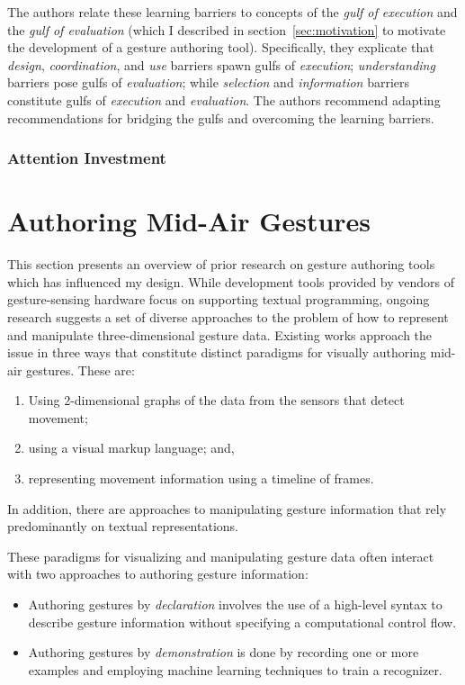 The authors relate these learning barriers to  concepts of the \emph{gulf of execution} and the \emph{gulf of evaluation} (which I described in section~\ref{sec:motivation} to motivate the development of a gesture authoring tool). Specifically, they explicate that \emph{design}, \emph{coordination}, and \emph{use} barriers spawn gulfs of \emph{execution}; \emph{understanding} barriers pose gulfs of \emph{evaluation}; while \emph{selection} and \emph{information} barriers constitute gulfs of \emph{execution} and \emph{evaluation}. The authors recommend adapting  recommendations for bridging the gulfs and overcoming the learning barriers.

\subsubsection{Attention Investment}

\section{Authoring Mid-Air Gestures}

This section presents an overview of prior research on gesture authoring tools which has influenced my design. While development tools provided by vendors of gesture-sensing hardware focus on supporting textual programming, ongoing research suggests a set of diverse approaches to the problem of how to represent and manipulate three-dimensional gesture data. Existing works approach the issue in three ways that constitute distinct paradigms for visually authoring mid-air gestures. These are:

\begin{enumerate}
\item Using 2-dimensional graphs of the data from the sensors that detect movement;
\item using a visual markup language; and,
\item representing movement information using a timeline of
frames.
\end{enumerate}

In addition, there are approaches to manipulating gesture information that rely predominantly on textual representations.

These paradigms for visualizing and manipulating gesture data often interact with two approaches to authoring gesture information:

\begin{itemize}
\item Authoring gestures by \emph{declaration} involves the use of a high-level syntax to describe gesture information without specifying a computational control flow.
\item Authoring gestures by \emph{demonstration} is done by recording one or more examples and employing machine learning techniques to train a recognizer.
\end{itemize}

